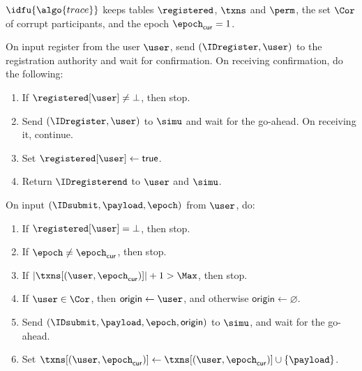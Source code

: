 \begingroup
    \begin{framed}


      $\idfu{\algo{trace}}$ keeps tables $\registered$, $\txns$ and $\perm$, the set
$\Cor$ of corrupt participants, and the epoch $\epoch_{\mathsf{cur}} = 1$.

	\fuinterface{\IDregister} On input register from the user $\user$, send
$(\IDregister, \user)$ to the registration authority and wait for confirmation.
On receiving confirmation, do the following:

	\begin{enumerate}

	  \item If $\registered[\user] \neq \bot$, then stop.

	  \item Send $(\IDregister, \user)$ to $\simu$ and wait for the
go-ahead. On receiving it, continue.

	  \item Set $\registered[\user] \leftarrow \mathsf{true}$.

	  \item Return $\IDregisterend$ to $\user$ and $\simu$.

	\end{enumerate}

	\fuinterface{\IDsubmit} On input $(\IDsubmit, \payload, \epoch)$ from $\user$,
do:

	\begin{enumerate}

	  \item If $\registered[\user] = \bot$, then stop.

	  \item If $\epoch \neq \epoch_{\mathsf{cur}}$, then stop.

	  \item If $|\txns[(\user,\epoch_{\mathsf{cur}})]| + 1 > \Max$, then
stop.

	  \item If $\user \in \Cor$, then $\mathsf{origin} \leftarrow \user$, and
otherwise $\mathsf{origin} \leftarrow \varnothing$.

	  \item Send $(\IDsubmit, \payload, \epoch, \mathsf{origin})$ to
$\simu$, and wait for the go-ahead.

	  \item Set $\txns[(\user,\epoch_{\mathsf{cur}})] \leftarrow
\txns[(\user,\epoch_{\mathsf{cur}})] \cup \{\payload\}$.


\end{enumerate}
\end{framed}
